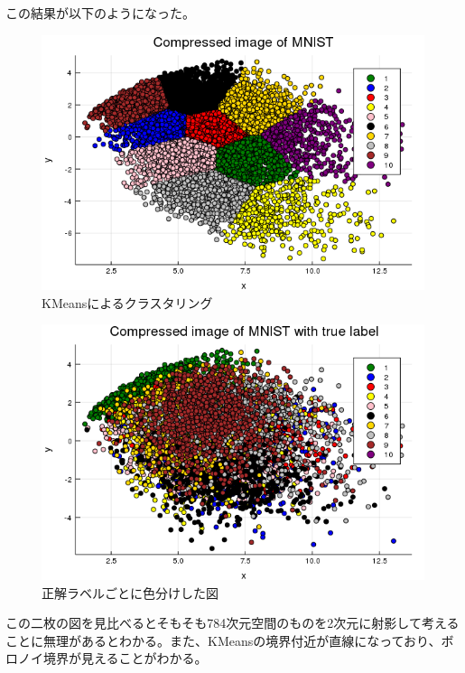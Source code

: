 \documentclass[10pt,a4paper]{ltjsarticle}       %
\begin{document}
この結果が以下のようになった。
\begin{figure}[htbp]
\begin{center}
\includegraphics[clip, scale=0.6]{scatter.png}
\caption{KMeansによるクラスタリング}
\end{center}
\end{figure}

\begin{figure}[htbp]
\begin{center}
\includegraphics[clip, scale=0.6]{scatter_true.png}
\caption{正解ラベルごとに色分けした図}
\end{center}
\end{figure}

この二枚の図を見比べるとそもそも784次元空間のものを2次元に射影して考えることに無理があるとわかる。また、KMeansの境界付近が直線になっており、ボロノイ境界が見えることがわかる。
\end{document}
